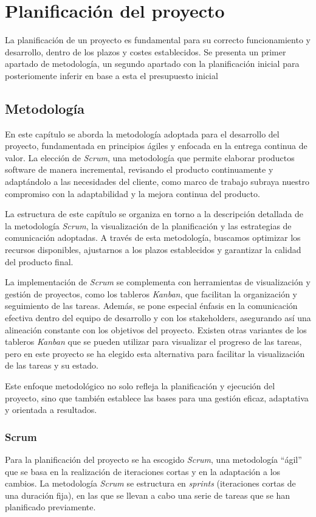 \chapter{Planificación del proyecto}\label{chap:planif}
La planificación de un proyecto es fundamental para su correcto funcionamiento y desarrollo,
dentro de los plazos y costes establecidos. Se presenta un primer apartado de metodología, un
segundo apartado con la planificación inicial para posteriomente inferir en base a esta el
presupuesto inicial


\section{Metodología}\label{sec:metodología}
En este capítulo se aborda la metodología adoptada para el desarrollo del proyecto, fundamentada
en principios ágiles y enfocada en la entrega continua de valor. La elección de \textit{Scrum},
una metodología que permite elaborar productos software de manera incremental, revisando el
producto continuamente y adaptándolo a las necesidades del cliente, como marco de trabajo subraya
nuestro compromiso con la adaptabilidad y la mejora continua del producto.

La estructura de este capítulo se organiza en torno a la descripción detallada de la metodología
\textit{Scrum}, la visualización de la planificación y las estrategias de comunicación adoptadas.
A través de esta metodología, buscamos optimizar los recursos disponibles, ajustarnos a los plazos
establecidos y garantizar la calidad del producto final.

La implementación de \textit{Scrum} se complementa con herramientas de visualización y gestión de
proyectos, como los tableros \textit{Kanban}, que facilitan la organización y seguimiento de
las tareas. Además, se pone especial énfasis en la comunicación efectiva dentro del equipo de
desarrollo y con los stakeholders, asegurando así una alineación constante con los objetivos del
proyecto. Existen otras variantes de los tableros \textit{Kanban} que se pueden utilizar para
visualizar el progreso de las tareas, pero en este proyecto se ha elegido esta alternativa para
facilitar la visualización de las tareas y su estado.

Este enfoque metodológico no solo refleja la planificación y ejecución del proyecto, sino que
también establece las bases para una gestión eficaz, adaptativa y orientada a resultados.

\subsection{Scrum}\label{subsec:scrum}
Para la planificación del proyecto se ha escogido \textit{Scrum}, una metodología ``ágil'' que se
basa en la realización de iteraciones cortas y en la adaptación a los cambios. La metodología
\textit{Scrum} se estructura en \textit{sprints} (iteraciones cortas de una duración fija),
en las que se llevan a cabo una serie de tareas que se han planificado previamente.

